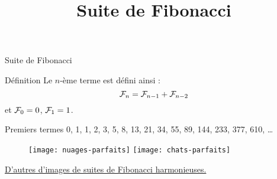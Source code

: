 \documentclass[10pt]{beamer}
\title{Suite de Fibonacci}
\newcommand{\F}[1]{\ensuremath{{\cal F}_{#1}}\xspace}
\begin{document}
\maketitle

\begin{frame}{Suite de Fibonacci}

  \begin{block}{Définition}
    Le $n$-ème terme est défini ainsi :
    \begin{equation*}
      \F{n} = \F{n-1} + \F{n-2}
    \end{equation*}
    et $\F{0} = 0$, $\F{1} = 1$.
  \end{block}
  
  \begin{exampleblock}{Premiers termes}
    0, 1, 1, 2, 3, 5, 8, 13, 21, 34, 55, 89, 144, 233, 377, 610, \dots
  \end{exampleblock}
  \begin{figure}[htbp]
    \centering
    \texttt{[image: nuages-parfaits]}
    \hfill
    \texttt{[image: chats-parfaits]}
  \end{figure}
  \href{https://archzine.fr/lifestyle/art/suite-de-fibonacci-harmonieuse/}{D'autres d'images de suites de Fibonacci harmonieuses.}

\end{frame}
\end{document}

